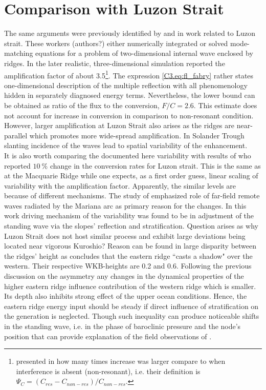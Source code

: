 \documentclass[12pt]{article}
\begin{document}
\section{Comparison with Luzon Strait}
\label{C3.sec:disc_luzon}
The same arguments were previously identified by \cite{buijsman2012double} and 
\cite{klymak2013parameterizing} in work related to Luzon strait. These workers (authors?) either numerically integrated or solved mode-matching equations for a problem of two-dimensional internal wave enclosed by ridges. In the later  realistic, three-dimensional simulation \citep{buijsman2014three} reported the amplification factor of about 
3.5\footnote{\citep{buijsman2014three} presented in how many times increase was larger compare to 
when interference is absent (non-resonant), i.e. their definition is 
$\Psi_C = (C_{res} - C_{non-res})/C_{non-res}$.}. The expression 
\eqref{C3.eq:fl_fabry} rather states one-dimensional description of the multiple reflection 
with all phenomenology hidden in separately diagnosed energy terms. Nevertheless, the lower bound can be obtained as ratio of the flux to the conversion, $F/C = 2.6$. This estimate does not account for increase in conversion in comparison to non-resonant condition. However, larger amplification at Luzon Strait also arises as the ridges are near-parallel which promotes more wide-spread amplification. In Solander Trough slanting incidence of the waves  lead to spatial variability of the enhancement.\\

It is also worth comparing the documented here variability with results of \cite{kerry2014impact} 
who reported $10~\%$ change in the conversion rates for Luzon strait. This is the same as at the 
Macquarie Ridge while one 
expects, as a first order guess, linear scaling of variability with the amplification factor. 
Apparently, the similar levels are because of different mechanisms. The study of 
\cite{kerry2014impact} 
emphasized role of far-field remote waves radiated by the Mariana arc as primary reason for the 
changes. In this work driving mechanism of the variability was found to be in 
adjustment of the standing wave via the slopes' reflection and stratification. Question arises as 
why Luzon Strait 
does not host similar process and exhibit large deviations being located near vigorous Kuroshio? 
Reason can be 
found in large 
disparity 
between the ridges' height as \cite{klymak2013parameterizing} concludes that the eastern ridge ``casts 
a shadow" over the western. Their respective WKB-heights are 0.2 and 0.6. Following the previous 
discussion on the asymmetry any changes in the dynamical properties of the higher eastern ridge 
influence contribution of the western ridge which is smaller. Its depth also 
inhibits strong effect of the upper ocean conditions. Hence, the eastern 
ridge energy input should be steady if direct influence of stratification on the generation is 
neglected. Though such inequality can produce noticeable shifts in the standing wave, i.e. in the phase of baroclinic pressure and the node's position that can provide explanation of the field observations of \cite{buijsman2014three}.
\end{document}
